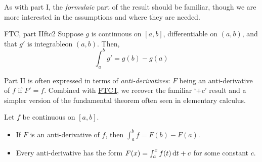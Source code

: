 \vfil\goodbreak


As with part I, the \emph{formulaic} part of the result should be familiar, though we are more interested in the assumptions and where they are needed.

\begin{thm}{FTC, part II}{ftc2}
Suppose $g$ is continuous on $[a,b]$, differentiable on $(a,b)$, and that $g'$ is integrable\footnotemark on $(a,b)$. Then,
\[\int_a^bg'=g(b)-g(a)\]
\end{thm}





Part II is often expressed in terms of \emph{anti-derivatives}: $F$ being an anti-derivative of $f$ if $F'=f$. Combined with \hyperref[thm:ftc1]{FTC\,I}, we recover the familiar `$+c$' result and a simpler version of the fundamental theorem often seen in elementary calculus.


\begin{cor}{}{}
Let $f$ be continuous on $[a,b]$.
\begin{itemize}
  \item If $F$ is an anti-derivative of $f$, then $\int_a^bf=F(b)-F(a)$.
  \item Every anti-derivative has the form $F(x)=\int_a^xf(t)\,{\mathrm{d} t}+c$ for some constant $c$.
\end{itemize}
\end{cor}



